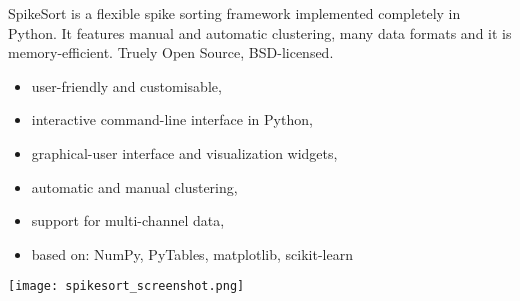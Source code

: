 \begin{multicols}{3}

SpikeSort is a flexible spike sorting framework implemented completely
in Python. It features manual and automatic clustering, many data
formats and it is memory-efficient. Truely Open Source, BSD-licensed.

\begin{itemize}[nolistsep,topsep=0em,leftmargin=1pc]
\item user-friendly and customisable,
\item interactive command-line interface in Python,
\item graphical-user interface and visualization widgets,
\item automatic and manual clustering,
\item support for multi-channel data,
\item based on: NumPy, PyTables, matplotlib, scikit-learn
\end{itemize}

\texttt{[image: spikesort\_screenshot.png]}
%

\end{multicols}


